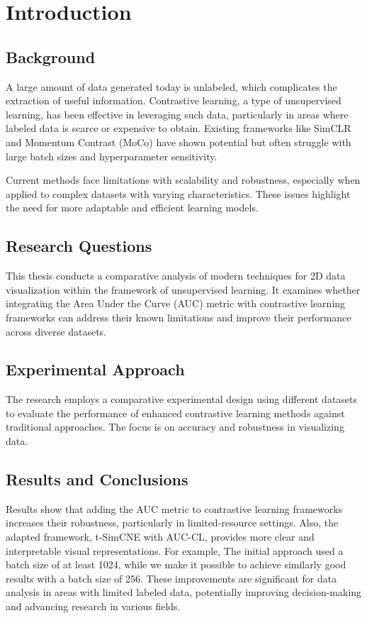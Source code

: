 \chapter{Introduction}
\label{chap:intro}

\section{Background}
A large amount of data generated today is unlabeled, which complicates the extraction of useful information. Contrastive learning, a type of unsupervised learning, has been effective in leveraging such data, particularly in areas where labeled data is scarce or expensive to obtain. Existing frameworks like SimCLR \cite{simclr} and Momentum Contrast (MoCo) \cite{moco} have shown potential but often struggle with large batch sizes and hyperparameter sensitivity.

Current methods face limitations with scalability and robustness, especially when applied to complex datasets with varying characteristics. These issues highlight the need for more adaptable and efficient learning models.

\section{Research Questions}
This thesis conducts a comparative analysis of modern techniques for 2D data visualization within the framework of unsupervised learning. It examines whether integrating the Area Under the Curve (AUC) metric \cite{sharma2023auc} with contrastive learning frameworks can address their known limitations and improve their performance across diverse datasets.

\section{Experimental Approach}
The research employs a comparative experimental design using different datasets to evaluate the performance of enhanced contrastive learning methods against traditional approaches. The focus is on accuracy and robustness in visualizing data.

\section{Results and Conclusions}
Results show that adding the AUC metric to contrastive learning frameworks increases their robustness, particularly in limited-resource settings. Also, the adapted framework, t-SimCNE with AUC-CL, provides more clear and interpretable visual representations. For example, The initial approach used a batch size of at least 1024, while we make it possible to achieve similarly good results with a batch size of 256.
These improvements are significant for data analysis in areas with limited labeled data, potentially improving decision-making and advancing research in various fields.

